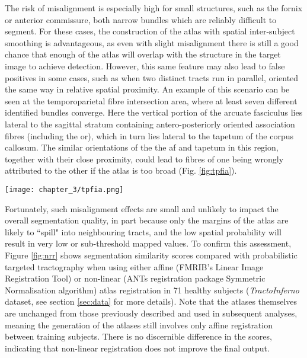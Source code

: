 The risk of misalignment is especially high for small structures, such as the fornix or anterior commissure, both narrow bundles which are reliably difficult to segment.
For these cases, the construction of the atlas with spatial inter-subject smoothing is advantageous, as even with slight misalignment there is still a good chance that enough of the atlas will overlap with the structure in the target image to achieve detection.
However, this same feature may also lead to false positives in some cases, such as when two distinct tracts run in parallel, oriented the same way in relative spatial proximity.
An example of this scenario can be seen at the temporoparietal fibre intersection area, where at least seven different identified bundles converge.\autocite{Martino2013b}
Here the vertical portion of the arcuate fasciculus lies lateral to the sagittal stratum containing antero-posteriorly oriented association fibres (including the \gls{or}), which in turn lies lateral to the tapetum of the corpus callosum.
The similar orientations of the the \gls{af} and tapetum in this region, together with their close proximity, could lead to fibres of one being wrongly attributed to the other if the atlas is too broad (Fig. \ref{fig:tpfia}).

\begin{SCfigure}[][h!]
  \captionsetup{format=plain}
  \texttt{[image: chapter\_3/tpfia.png]}
  \caption{Example of potential for atlas misalignment. The \gls{af} (*) and tapetum (**) are proximal and parallel at the temporoparietal fibre intersection area. Linearly registered right \gls{af} atlas \glspl{tod} may overlap with tapetum (arrow).}
  \label{fig:tpfia}
\end{SCfigure}

Fortunately, such misalignment effects are small and unlikely to impact the overall segmentation quality, in part because only the margins of the atlas are likely to ``spill" into neighbouring tracts, and the low spatial probability will result in very low or sub-threshold mapped values.
To confirm this assessment, Figure \ref{fig:nrr} shows segmentation similarity scores compared with probabilistic targeted tractography when using either affine (FMRIB's Linear Image Registration Tool\autocite{Jenkinson2002}) or non-linear (ANTs registration package Symmetric Normalisation algorithm\autocite{Tustison2013,Avants2011}) atlas registration in 71 healthy subjects (\textit{TractoInferno} dataset, see section \ref{sec:data} for more details).
Note that the atlases themselves are unchanged from those previously described and used in subsequent analyses, meaning the generation of the atlases still involves only affine registration between training subjects.
There is no discernible difference in the scores, indicating that non-linear registration does not improve the final output.

